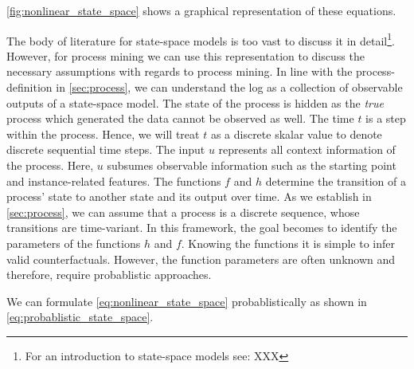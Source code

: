 \documentclass[12pt,a4paper]{report}
\begin{document}
\autoref{fig:nonlinear_state_space} shows a graphical representation of these equations.

The body of literature for state-space models is too vast to discuss it in detail\footnote{For an introduction to state-space models see: XXX}. However, for process mining we can use this representation to discuss the necessary assumptions with regards to process mining.
In line with the process-definition in \autoref{sec:process}, we can understand the \gls{log} as a collection of observable outputs of a state-space model. The state of the process is hidden as the \emph{true} process which generated the data cannot be observed as well. The time $t$ is a step within the process. Hence, we will treat $t$ as a discrete skalar value to denote discrete sequential time steps. The input $u$ represents all context information of the process. Here, $u$ subsumes observable information such as the starting point and \gls{instance}-related features. The functions $f$ and $h$ determine the transition of a process' state to another state and its output over time. As we establish in \autoref{sec:process}, we can assume that a process is a discrete sequence, whose transitions are time-variant. In this framework, the goal becomes to identify the parameters of the functions $h$ and $f$. Knowing the functions it is simple to infer valid counterfactuals. However, the function parameters are often unknown and therefore, require probablistic approaches.

We can formulate \autoref{eq:nonlinear_state_space} probablistically as shown in \autoref{eq:probablistic_state_space}.
\end{document}
